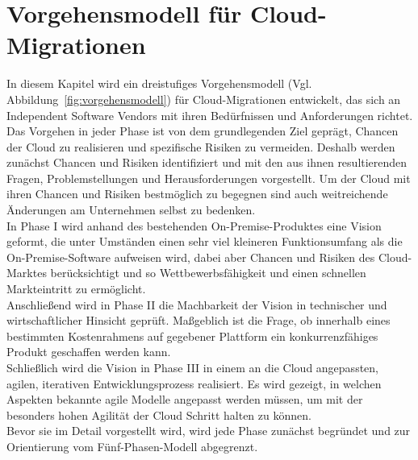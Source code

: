 \section{Vorgehensmodell für Cloud-Migrationen}
\label{cha:entwickelung_vorgehensmodell}
In diesem Kapitel wird ein dreistufiges Vorgehensmodell (Vgl. 
Abbildung~\ref{fig:vorgehensmodell}) für Cloud-Migrationen entwickelt, das sich 
an Independent Software Vendors mit ihren Bedürfnissen und Anforderungen 
richtet. \\

Das Vorgehen in jeder Phase ist von dem grundlegenden Ziel geprägt, Chancen der 
Cloud zu realisieren und spezifische Risiken zu vermeiden. Deshalb werden 
zunächst Chancen und Risiken identifiziert und mit den aus ihnen resultierenden 
Fragen, Problemstellungen und Herausforderungen vorgestellt. Um der 
Cloud mit ihren Chancen und Risiken bestmöglich zu begegnen sind auch 
weitreichende Änderungen am Unternehmen selbst zu bedenken.\\

In Phase I wird anhand des bestehenden On-Premise-Produktes eine Vision 
geformt, die unter Umständen einen sehr viel kleineren Funktionsumfang als die 
On-Premise-Software aufweisen wird, dabei aber Chancen und Risiken des 
Cloud-Marktes berücksichtigt und so Wettbewerbsfähigkeit und einen schnellen 
Markteintritt zu ermöglicht. \\

Anschließend wird in Phase II die Machbarkeit der Vision in technischer und 
wirtschaftlicher Hinsicht geprüft. Maßgeblich ist die Frage, ob innerhalb 
eines bestimmten Kostenrahmens auf gegebener
Plattform ein konkurrenzfähiges Produkt geschaffen werden kann. \\

Schließlich wird die Vision in Phase III in einem an die Cloud 
angepassten, agilen, iterativen Entwicklungsprozess realisiert. Es wird 
gezeigt, in welchen Aspekten bekannte agile Modelle angepasst werden müssen, um 
mit der besonders hohen Agilität der Cloud Schritt halten zu können. \\

Bevor sie im Detail vorgestellt wird, wird jede Phase zunächst begründet 
und zur Orientierung vom Fünf-Phasen-Modell abgegrenzt. 


